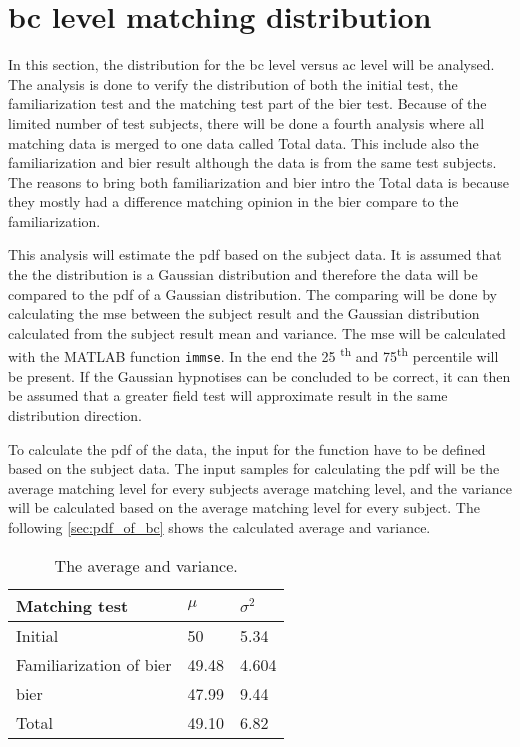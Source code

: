 \section{\gls{bc} level matching distribution}
In this section, the distribution for the \gls{bc} level versus \gls{ac} level will be analysed. The analysis is done to verify the distribution of both the initial test, the familiarization test and the matching test part of the \gls{bier} test. Because of the limited number of test subjects, there will be done a fourth analysis where all matching data is merged to one data called Total data. This include also the familiarization and \gls{bier} result although the data is from the same test subjects. The reasons to bring both familiarization and \gls{bier} intro the Total data is because they mostly had a difference matching opinion in the \gls{bier} compare to the familiarization.


This analysis will estimate the \gls{pdf} based on the subject data. It is assumed that the the distribution is a Gaussian distribution and therefore the data will be compared to the \gls{pdf} of a Gaussian distribution. The comparing will be done by calculating the \gls{mse} between the subject result and the Gaussian distribution calculated from the subject result mean and variance. The \gls{mse} will be calculated with the MATLAB function \texttt{immse}. In the end the 25 \textsuperscript{th} and 75\textsuperscript{th} percentile will be present. If the Gaussian hypnotises can be concluded to be correct, it can then be assumed that a greater field test will approximate result in the same distribution direction.

To calculate the \gls{pdf} of the data, the input for the function have to be defined based on the subject data. The input samples for calculating the  \gls{pdf} will be the average matching level for every subjects average matching level, and the variance will be calculated based on the average matching level for every subject. The following \autoref{sec:pdf_of_bc} shows the calculated average and variance. 

\begin{table}[H]
\centering
\caption{The average and variance.}
\begin{tabular}{l|ll}
Matching test                 & $\mu$ & $\sigma^2$ \\ \hline
Initial                       & 50    & 5.34       \\
Familiarization of \gls{bier} & 49.48 & 4.604      \\
\gls{bier}                    & 47.99 & 9.44      \\
Total                    & 49.10 & 6.82      
\end{tabular}
\label{sec:pdf_of_bc}
\end{table}

